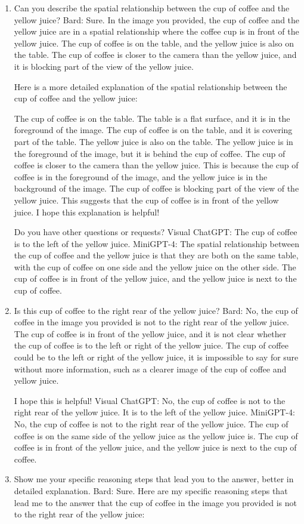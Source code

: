 \begin{enumerate}
    \item Can you describe the spatial relationship between the cup of coffee and the yellow juice?
    \subitem Bard: 
    Sure. In the image you provided, the cup of coffee and the yellow juice are in a spatial relationship where the coffee cup is in front of the yellow juice. The cup of coffee is on the table, and the yellow juice is also on the table. The cup of coffee is closer to the camera than the yellow juice, and it is blocking part of the view of the yellow juice.
    
    Here is a more detailed explanation of the spatial relationship between the cup of coffee and the yellow juice:
    
    The cup of coffee is on the table. The table is a flat surface, and it is in the foreground of the image. The cup of coffee is on the table, and it is covering part of the table.
    The yellow juice is also on the table. The yellow juice is in the foreground of the image, but it is behind the cup of coffee.
    The cup of coffee is closer to the camera than the yellow juice. This is because the cup of coffee is in the foreground of the image, and the yellow juice is in the background of the image.
    The cup of coffee is blocking part of the view of the yellow juice. This suggests that the cup of coffee is in front of the yellow juice.
    I hope this explanation is helpful!
    
    Do you have other questions or requests?
    \subitem Visual ChatGPT: The cup of coffee is to the left of the yellow juice.
    \subitem MiniGPT-4: The spatial relationship between the cup of coffee and the yellow juice is that they are both on the same table, with the cup of coffee on one side and the yellow juice on the other side. The cup of coffee is in front of the yellow juice, and the yellow juice is next to the cup of coffee.
    \item Is this cup of coffee to the right rear of the yellow juice?
    \subitem Bard: 
    No, the cup of coffee in the image you provided is not to the right rear of the yellow juice. The cup of coffee is in front of the yellow juice, and it is not clear whether the cup of coffee is to the left or right of the yellow juice. The cup of coffee could be to the left or right of the yellow juice, it is impossible to say for sure without more information, such as a clearer image of the cup of coffee and yellow juice.

    I hope this is helpful!
    \subitem Visual ChatGPT: No, the cup of coffee is not to the right rear of the yellow juice. It is to the left of the yellow juice.
    \subitem MiniGPT-4: No, the cup of coffee is not to the right rear of the yellow juice. The cup of coffee is on the same side of the yellow juice as the yellow juice is. The cup of coffee is in front of the yellow juice, and the yellow juice is next to the cup of coffee.
    \item Show me your specific reasoning steps that lead you to the answer, better in detailed explanation.
    \subitem Bard: Sure. Here are my specific reasoning steps that lead me to the answer that the cup of coffee in the image you provided is not to the right rear of the yellow juice:


\end{enumerate}
